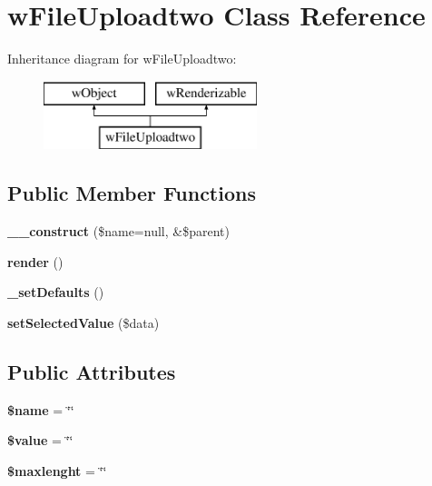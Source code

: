 \hypertarget{classwFileUploadtwo}{
\section{wFileUploadtwo Class Reference}
\label{classwFileUploadtwo}
}
Inheritance diagram for wFileUploadtwo:\begin{figure}[H]
\begin{center}
\leavevmode
\includegraphics[height=2.000000cm]{classwFileUploadtwo}
\end{center}
\end{figure}
\subsection*{Public Member Functions}
\begin{DoxyCompactItemize}
\item 
\hypertarget{classwFileUploadtwo_a3113c74facfa0d105d0c8269216db92c}{
{\bfseries \_\-\_\-construct} (\$name=null, \&\$parent)}
\label{classwFileUploadtwo_a3113c74facfa0d105d0c8269216db92c}

\item 
\hypertarget{classwFileUploadtwo_a6b6a5f8b9c423966b90832a511ef173d}{
{\bfseries render} ()}
\label{classwFileUploadtwo_a6b6a5f8b9c423966b90832a511ef173d}

\item 
\hypertarget{classwFileUploadtwo_aeaf4ef4719c9695bd0ec5488f874c2da}{
{\bfseries \_\-setDefaults} ()}
\label{classwFileUploadtwo_aeaf4ef4719c9695bd0ec5488f874c2da}

\item 
\hypertarget{classwFileUploadtwo_a8d947b19aa8cd48839bfdb313f22a996}{
{\bfseries setSelectedValue} (\$data)}
\label{classwFileUploadtwo_a8d947b19aa8cd48839bfdb313f22a996}

\end{DoxyCompactItemize}
\subsection*{Public Attributes}
\begin{DoxyCompactItemize}
\item 
\hypertarget{classwFileUploadtwo_ac34c4b8e1796a1df09b6b3e56770c437}{
{\bfseries \$name} = \char`\"{}\char`\"{}}
\label{classwFileUploadtwo_ac34c4b8e1796a1df09b6b3e56770c437}

\item 
\hypertarget{classwFileUploadtwo_a8f3b45b500557f5bf717a8ed4b35809c}{
{\bfseries \$value} = \char`\"{}\char`\"{}}
\label{classwFileUploadtwo_a8f3b45b500557f5bf717a8ed4b35809c}

\item 
\hypertarget{classwFileUploadtwo_a77d70a4521eaa8df2f6a648047a1cf44}{
{\bfseries \$maxlenght} = \char`\"{}\char`\"{}}
\label{classwFileUploadtwo_a77d70a4521eaa8df2f6a648047a1cf44}

\end{DoxyCompactItemize}



